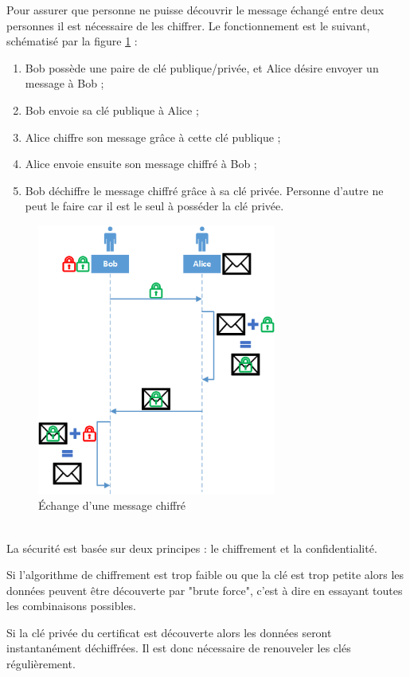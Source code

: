 Pour assurer que personne ne puisse découvrir le message échangé entre deux personnes il est nécessaire de les chiffrer.
Le fonctionnement est le suivant, schématisé par la figure \ref{chiffrement} :
\begin{enumerate}
	\item Bob possède une paire de clé publique/privée, et Alice désire envoyer un message à Bob ;
	\item Bob envoie sa clé publique à Alice ;
	\item Alice chiffre son message grâce à cette clé publique ;
	\item Alice envoie ensuite son message chiffré à Bob ;
	\item Bob déchiffre le message chiffré grâce à sa clé privée. Personne d'autre ne peut le faire car il est le seul à posséder la clé privée.
\end{enumerate}
\begin{figure}[!h]
	\center
	\includegraphics[width=0.7\textwidth]{img/chiffrement.png}
	\caption{Échange d'une message chiffré}
	\label{chiffrement}
\end{figure}
~~\\

La sécurité est basée sur deux principes : le chiffrement et la confidentialité.

Si l'algorithme de chiffrement est trop faible ou que la clé est trop petite alors les données peuvent être découverte par "brute force", c'est à dire en essayant toutes les combinaisons possibles.

Si la clé privée du certificat est découverte alors les données seront instantanément déchiffrées.
Il est donc nécessaire de renouveler les clés régulièrement.

